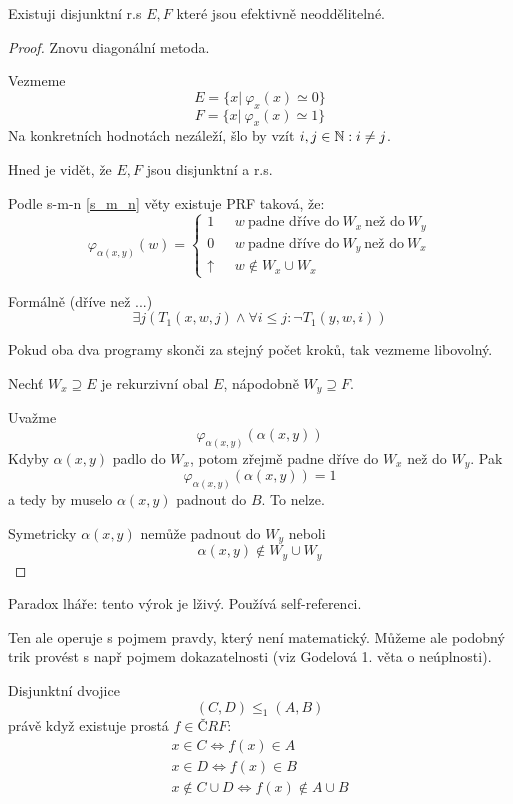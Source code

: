 \begin{theorem}
	Existuji disjunktní r.s $E, F$ které jsou efektivně neoddělitelné.
\end{theorem}
\begin{proof}
	Znovu diagonální metoda.

	Vezmeme
	\[ E = \{ x|\ \varphi_x(x) \simeq 0 \} \]
	\[ F = \{ x|\ \varphi_x(x) \simeq 1 \} \]
	Na konkretních hodnotách nezáleží, šlo by vzít $i, j \in \operatorname{\mathbb{N}}: i \ne j$.

	Hned je vidět, že $E, F$ jsou disjunktní a r.s.

	Podle s-m-n \cref{s_m_n} věty existuje PRF taková, že:
	\[ \varphi_{\alpha(x, y)} (w) =
		\left\{
		\begin{array}{lll}
			1 & \mbox{ } w \ \text{padne dříve do} \ W_x \ \text{než do} \ W_y \\
			0 & \mbox{ } w \ \text{padne dříve do} \ W_y \ \text{než do} \ W_x \\
			\uparrow & \mbox{ } w \notin W_x \cup W_x
		\end{array}
		\right.
	\]

	Formálně (dříve než ...)
	\[ \exists j (T_1(x, w, j) \land \forall i \leq j: \neg T_1(y, w, i)) \]

	Pokud oba dva programy skonči za stejný počet kroků, tak vezmeme libovolný.

	Nechť $W_x \supseteq E$ je rekurzivní obal $E$, nápodobně $W_y \supseteq F$.

	Uvažme
	\[ \varphi_{\alpha(x, y)}(\alpha(x, y)) \]
	Kdyby $\alpha(x, y)$ padlo do $W_x$, potom zřejmě padne dříve do $W_x$ než do $W_y$.
	Pak
	\[ \varphi_{\alpha(x, y)}(\alpha(x, y)) = 1 \]
	a tedy by muselo $\alpha(x, y)$ padnout do $B$. To nelze.

	Symetricky $\alpha(x, y)$ nemůže padnout do $W_y$ neboli
	\[ \alpha(x, y) \notin W_y \cup W_y \]

\end{proof}

\begin{note}
	Paradox lháře: tento výrok je lživý.
	Používá self-referenci.

	Ten ale operuje s pojmem pravdy, který není matematický.
	Můžeme ale podobný trik provést s např pojmem dokazatelnosti (viz Godelová 1. věta o neúplnosti).
\end{note}

\begin{definition}
	Disjunktní dvojice
	\[ (C, D) \leq_1 (A, B) \]
	právě když existuje prostá $f \in ČRF$:
	\begin{gather*}
		x \in C \iff f(x) \in A\\
		x \in D \iff f(x) \in B\\
		x \notin C \cup D \iff f(x) \notin A \cup B
	\end{gather*}
\end{definition}

